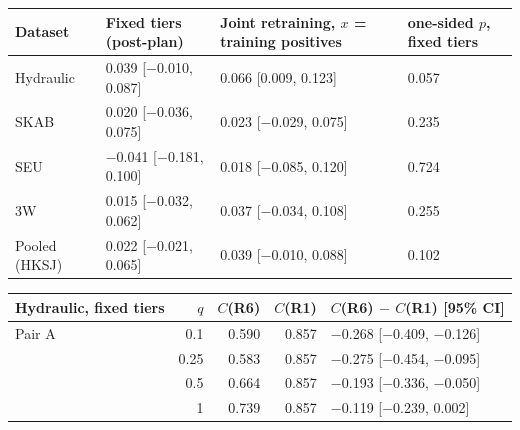 \begin{tabular}{@{}l lll@{}}
\toprule
Dataset & Fixed tiers (post-plan) & Joint retraining, $x$ = training positives & one-sided $p$, fixed tiers \\
\midrule
Hydraulic & 0.039 [$-$0.010, 0.087] & 0.066 [0.009, 0.123] & 0.057 \\
SKAB & 0.020 [$-$0.036, 0.075] & 0.023 [$-$0.029, 0.075] & 0.235 \\
SEU & $-$0.041 [$-$0.181, 0.100] & 0.018 [$-$0.085, 0.120] & 0.724 \\
3W & 0.015 [$-$0.032, 0.062] & 0.037 [$-$0.034, 0.108] & 0.255 \\
Pooled (HKSJ) & 0.022 [$-$0.021, 0.065] & 0.039 [$-$0.010, 0.088] & 0.102 \\
\bottomrule
\end{tabular}
\par\medskip
\begin{tabular}{@{}l rrr l@{}}
\toprule
Hydraulic, fixed tiers & $q$ & $C$(R6) & $C$(R1) & $C$(R6) $-$ $C$(R1) [95\% CI] \\
\midrule
Pair A & 0.1 & 0.590 & 0.857 & $-$0.268 [$-$0.409, $-$0.126] \\
 & 0.25 & 0.583 & 0.857 & $-$0.275 [$-$0.454, $-$0.095] \\
 & 0.5 & 0.664 & 0.857 & $-$0.193 [$-$0.336, $-$0.050] \\
 & 1 & 0.739 & 0.857 & $-$0.119 [$-$0.239, 0.002] \\
\bottomrule
\end{tabular}
